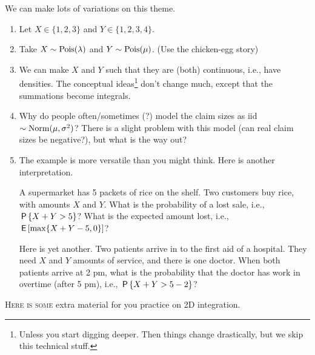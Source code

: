 \begin{remark}
We can  make lots of variations on this theme.
\begin{enumerate}
\item Let $X\in \{1,2,3\}$ and $Y\in \{1,2,3,4\}$.
\item Take $X\sim\Pois{\lambda}$ and $Y\sim\Pois{\mu}$. (Use the chicken-egg story)
\item We can make $X$ and $Y$ such that they are (both) continuous, i.e., have densities.
  The conceptual ideas\footnote{Unless you start digging deeper.
    Then things change drastically, but we skip this technical stuff.}
  don't change much, except that the summations become integrals.
\item Why do people often/sometimes (?)
  model the claim sizes as iid $\sim\Norm{\mu, \sigma^{2}}$?
  There is a slight problem with this model (can real claim sizes be negative?), but what is the way out?
\item The example is more versatile than you might think. Here is another interpretation.

A supermarket has 5 packets of rice on the shelf.
Two customers buy rice, with amounts $X$ and $Y$.
What is the probability of a lost sale, i.e., $\P{X+Y>5}$?
What is the expected amount lost, i.e., $\E{ \max\{X+Y - 5,0\}}$?

Here is yet another.
Two patients arrive in to the first aid of a hospital.
They need $X$ and $Y$ amounts of service, and there is one doctor.
When both patients arrive at 2 pm, what is the probability that the doctor has work in overtime (after 5 pm), i.e., $\P{X+Y > 5- 2}$?
\end{enumerate}
\end{remark}



\textsc{Here is some} extra material for you practice on 2D integration.

